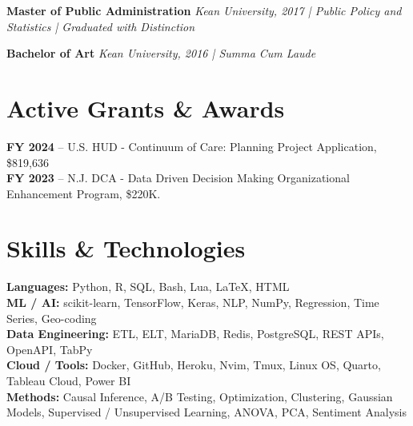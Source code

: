 \documentclass[11pt,a4paper]{article}
\begin{document}
\vspace{0.3em}

\par\noindent\textbf{Master of Public Administration}  
\newline\textit{Kean University, 2017 | Public Policy and Statistics | Graduated with
Distinction}  

\vspace{0.3em}

\par\noindent\textbf{Bachelor of Art}  
\newline\textit{Kean University, 2016 | Summa Cum Laude}  

\section*{Active Grants \& Awards}
\textbf{FY 2024} – U.S. HUD - Continuum of Care: Planning Project Application, \$819,636\\
\textbf{FY 2023} – N.J. DCA - Data Driven Decision Making Organizational Enhancement Program, \$220K. \\

\section*{Skills \& Technologies}

\textbf{Languages:} Python, R, SQL, Bash, Lua, LaTeX, HTML \\
\textbf{ML / AI:} scikit-learn, TensorFlow, Keras, NLP, NumPy, Regression, Time Series, Geo-coding \\
\textbf{Data Engineering:} ETL, ELT, MariaDB, Redis, PostgreSQL, REST APIs, OpenAPI, TabPy \\
\textbf{Cloud / Tools:} Docker, GitHub, Heroku, Nvim, Tmux, Linux OS, Quarto, Tableau Cloud,
Power BI \\
\textbf{Methods:} Causal Inference, A/B Testing, Optimization, Clustering, Gaussian
Models, Supervised / Unsupervised Learning, ANOVA, PCA, Sentiment Analysis
\end{document}
